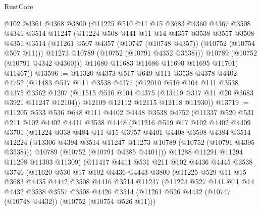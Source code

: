 \begin{lexlean}{RustCore}
\begin{coremodule}
          @102
          @4361
          @4368
          @3800
          (@11225
            @510
            @11
            @15
            @3683
            @4360
            @4367
            @3508
            @4341
            @3514
            @11247
            (@11224
              @508
              @141
              @11
              @14
              @4357
              @3538
              @3557
              @3508
              @4351
              @3514
              (@11261 @507 @4357 (@10747 (@10748 @4357)) (@10752 (@10754 @507 @11)))
              @11273
              @10789
              (@10752 (@10791 @4352 @3538)))
            @10789
            (@10752 (@10791 @4342 @4360)))
          @11680
          @11683
          @11686
          @11690
          @11695
          @11701)
        @11467))
@13596 := @11320
    @4373
    @517
    @649
    @111
    @3538
    @4378
    @4402
    @4752
    (@11483
      @517
      @111
      @3538
      @4377
      (@12010
        @516
        @104
        @111
        @3538
        @4375
        @3562
        @1207
        (@11515 @516 @104 @4375 (@13419 @317 @11 @20 @3683 @3921 @11247 @12104))
        @12109
        @12112
        @12115
        @12118
        @11930))
@13719 := @11205
    @533
    @536
    @648
    @111
    @4402
    @4448
    @3538
    @4752
    (@11337
      @520
      @531
      @211
      @102
      @4402
      @4411
      @3538
      @4448
      (@11216
        @519
        @17
        @102
        @4402
        @4409
        @3701
        (@11224
          @338
          @484
          @11
          @15
          @3957
          @4401
          @4408
          @3508
          @4384
          @3514
          @12224
          (@13306 @4394 @3514 @11247 @11273 @10789 (@10752 (@10791 @4395 @3538)))
          @10789
          (@10752 (@10791 @4385 @4401)))
        @11288
        @11291
        @11294
        @11298
        @11303
        @11309)
      (@11417
        @4411
        @531
        @211
        @102
        @4436
        @4445
        @3538
        @3746
        (@11620
          @530
          @17
          @102
          @4436
          @4443
          @3800
          (@11225
            @529
            @11
            @15
            @3683
            @4435
            @4442
            @3508
            @4416
            @3514
            @11247
            (@11224
              @527
              @141
              @11
              @14
              @4432
              @3538
              @3557
              @3508
              @4426
              @3514
              (@11261 @526 @4432 (@10747 (@10748 @4432)) (@10752 (@10754 @526 @11)))

\end{coremodule}
\end{lexlean}
